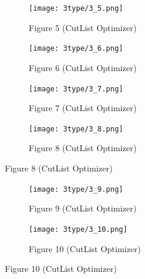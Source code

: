 \documentclass[a4paper]{article}
\begin{document}
\begin{figure}[H] %
  \centering
  \captionsetup{justification=centering, font=small} %
  \begin{subfigure}[b]{0.48\textwidth}
    \centering
    \texttt{[image: 3type/3\_5.png]}
    \caption{Figure 5 (CutList Optimizer) }
    \label{fig:5}
    \hfill
  \end{subfigure}
  \begin{subfigure}[b]{0.48\textwidth}
    \centering
    \texttt{[image: 3type/3\_6.png]}
    \caption{Figure 6 (CutList Optimizer) }
    \label{fig:6}
  \end{subfigure}
  
  \vspace{0.1cm}
  
  \begin{subfigure}[b]{0.48\textwidth}
    \centering
    \texttt{[image: 3type/3\_7.png]}
    \caption{Figure 7 (CutList Optimizer) }
    \label{fig:7}
    \end{subfigure}
    \hfill
  \begin{subfigure}[b]{0.48\textwidth}
    \centering
    \texttt{[image: 3type/3\_8.png]}
    \caption{Figure 8 (CutList Optimizer) }
    \label{fig:8}
  \end{subfigure}


 
  \label{fig:all_images_part2}
\end{figure}
\begin{figure}[H] %
  \centering
  \captionsetup{justification=centering, font=small} %

  \begin{subfigure}[b]{0.48\textwidth}
    \centering
    \texttt{[image: 3type/3\_9.png]}
    \caption{Figure 9 (CutList Optimizer) }
    \label{fig:9}
  \end{subfigure}
  \hfill
  \begin{subfigure}[b]{0.48\textwidth}
    \centering
    \texttt{[image: 3type/3\_10.png]}
    \caption{Figure 10 (CutList Optimizer) }
    \label{fig:10}
  \end{subfigure}
  \label{fig:all_images_part2}
\end{figure}
\end{document}
